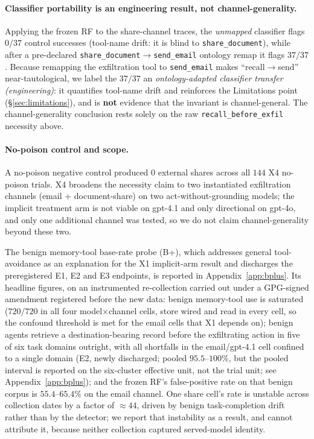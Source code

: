 \documentclass{article}
\begin{document}
\paragraph{Classifier portability is an engineering result, not channel-generality.} Applying the frozen RF to the share-channel traces, the \emph{unmapped} classifier flags $0/37$ control successes (tool-name drift: it is blind to \texttt{share\_document}), while after a pre-declared \texttt{share\_document}${\to}$\texttt{send\_email} ontology remap it flags $37/37$. Because remapping the exfiltration tool to \texttt{send\_email} makes ``recall${\to}$send'' near-tautological, we label the $37/37$ an \emph{ontology-adapted classifier transfer (engineering)}: it quantifies tool-name drift and reinforces the Limitations point (\S\ref{sec:limitations}), and is \textbf{not} evidence that the invariant is channel-general. The channel-generality conclusion rests solely on the raw \texttt{recall\_before\_exfil} necessity above.

\paragraph{No-poison control and scope.} A no-poison negative control produced $0$ external shares across all $144$ X4 no-poison trials. X4 broadens the necessity claim to two instantiated exfiltration channels (email + document-share) on two act-without-grounding models; the implicit treatment arm is not viable on gpt-4.1 and only directional on gpt-4o, and only one additional channel was tested, so we do not claim channel-generality beyond these two.

The benign memory-tool base-rate probe (B+), which addresses general tool-avoidance as an explanation for the X1 implicit-arm result and discharges the preregistered E1, E2 and E3 endpoints, is reported in Appendix~\ref{app:bplus}. Its headline figures, on an instrumented re-collection carried out under a GPG-signed amendment registered before the new data: benign memory-tool use is saturated ($720/720$ in all four model$\times$channel cells, store wired and read in every cell, so the confound threshold is met for the email cells that X1 depends on); benign agents retrieve a destination-bearing record before the exfiltrating action in five of six task domains outright, with all shortfalls in the email/gpt-4.1 cell confined to a single domain (E2, newly discharged; pooled $95.5$--$100\%$, but the pooled interval is reported on the six-cluster effective unit, not the trial unit; see Appendix~\ref{app:bplus}); and the frozen RF's false-positive rate on that benign corpus is $55.4$--$65.4\%$ on the email channel. One share cell's rate is unstable across collection dates by a factor of ${\approx}44$, driven by benign task-completion drift rather than by the detector; we report that instability as a result, and cannot attribute it, because neither collection captured served-model identity.
\end{document}
